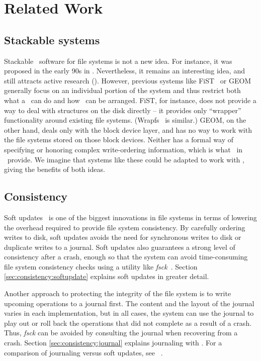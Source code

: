 \section{Related Work}
\label{sec:related}

\subsection{Stackable systems}


Stackable \module\ software for file systems is not a new idea. For instance, it
was proposed in the early 90s in \cite{rosenthal90evolving, heidemann91layered,
skinner93stacking, heidemann94filesystem}. Nevertheless, it remains an
interesting idea, and still attracts active research (\cite{zadok99extending,
zadok00fist}). However, previous systems like FiST~\cite{zadok00fist} or
GEOM~\cite{geom} generally focus on an individual portion of the system and
thus restrict both what a \module\ can do and how \modules\ can be arranged.
FiST, for instance, does not provide a way to deal with structures on the disk
directly -- it provides only ``wrapper'' functionality around existing file
systems. (Wrapfs~\cite{zadok99stackable, zadok99extending} is similar.) GEOM, on
the other hand, deals only with the block device layer, and has no way to work
with the file systems stored on those block devices. Neither has a formal way of
specifying or honoring complex write-ordering information, which is what
\chdescs\ in \Kudos\ provide. We imagine that systems like these could be
adapted to work with \chdescs, giving the benefits of both ideas.

\subsection{Consistency}

Soft updates~\cite{ganger00soft} is one of the biggest innovations in file
systems in terms of lowering the overhead required to provide file system
consistency. By carefully ordering writes to disk, soft updates avoids the need
for synchronous writes to disk or duplicate writes to a journal. Soft updates
also guarantees a strong level of consistency after a crash, enough so that the
system can avoid time-consuming file system consistency checks using a utility
like \emph{fsck}~\cite{mckusick94fsck}. Section \ref{sec:consistency:softupdate}
explains soft updates in greater detail.

Another approach to protecting the integrity of the file system is to write
upcoming operations to a journal first. The content and the layout of the
journal varies in each implementation, but in all cases, the system can use the
journal to play out or roll back the operations that did not complete as a
result of a crash. Thus, \emph{fsck} can be avoided by consulting the journal
when recovering from a crash. Section \ref{sec:consistency:journal} explains
journaling with \chdescs. For a comparison of journaling versus soft updates,
see ~\cite{seltzer00journaling}.

